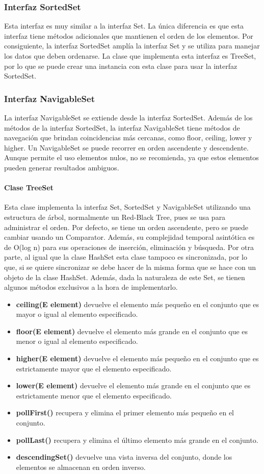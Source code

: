 \documentclass{report}
\begin{document}
\subsubsection{Interfaz SortedSet}
Esta interfaz es muy similar a la interfaz Set. La única diferencia es que esta interfaz tiene métodos adicionales que mantienen el orden de los elementos. Por consiguiente, la interfaz SortedSet amplía la interfaz Set y se utiliza para manejar los datos que deben ordenarse. La clase que implementa esta interfaz es TreeSet, por lo que se puede crear una instancia con esta clase para usar la interfaz SortedSet.
\subsubsection{Interfaz NavigableSet}
La interfaz NavigableSet se extiende desde la interfaz SortedSet. Además de los métodos de la interfaz SortedSet, la interfaz NavigableSet tiene métodos de navegación que brindan coincidencias más cercanas, como floor, ceiling, lower y higher. Un NavigableSet se puede recorrer en orden ascendente y descendente. Aunque permite el uso elementos nulos, no se recomienda, ya que estos elementos pueden generar resultados ambiguos.
\paragraph{Clase TreeSet}
Esta clase implementa la interfaz Set, SortedSet y NavigableSet utilizando una estructura de árbol, normalmente un Red-Black Tree, pues se usa para administrar el orden. Por defecto, se tiene un orden ascendente, pero se puede cambiar usando un Comparator. Además, su complejidad temporal asintótica es de O(log n) para sus operaciones de inserción, eliminación y búsqueda. Por otra parte, al igual que la clase HashSet esta clase tampoco es sincronizada, por lo que, si se quiere sincronizar se debe hacer de la misma forma que se hace con un objeto de la clase HashSet. Además, dada la naturaleza de este Set, se tienen algunos métodos exclusivos a la hora de implementarlo.
\begin{itemize}
    \item \textbf{ceiling(E element)} devuelve el elemento más pequeño en el conjunto que es mayor o igual al elemento especificado.
    \item \textbf{floor(E element)} devuelve el elemento más grande en el conjunto que es menor o igual al elemento especificado.
    \item \textbf{higher(E element)} devuelve el elemento más pequeño en el conjunto que es estrictamente mayor que el elemento especificado.
    \item \textbf{lower(E element)} devuelve el elemento más grande en el conjunto que es estrictamente menor que el elemento especificado.
    \item \textbf{pollFirst()} recupera y elimina el primer elemento más pequeño en el conjunto.
    \item \textbf{pollLast()} recupera y elimina el último elemento más grande en el conjunto.
    \item \textbf{descendingSet()} devuelve una vista inversa del conjunto, donde los elementos se almacenan en orden inverso.
\end{itemize}
\end{document}
